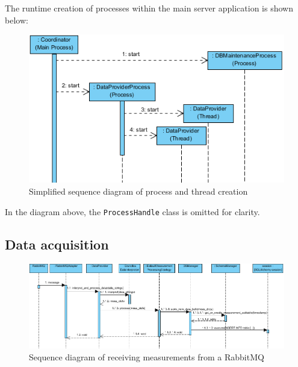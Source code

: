 The runtime creation of processes within the main server application is shown below:
\begin{figure}[H]
    \centering
    \includegraphics[width=\textwidth]{figures/seq_diagram_init}
    \caption{Simplified sequence diagram of process and thread creation}
    \label{figureSeqDiagram}
\end{figure}

In the diagram above, the \texttt{ProcessHandle} class is omitted for clarity.


\newpage
\subsection{Data acquisition}
\begin{figure}[H]
    \centering
    \includegraphics[width=0.9\textheight, angle=90]{figures/data_acq_seq_diagram}
    \caption{Sequence diagram of receiving measurements from a RabbitMQ}
    \label{figureSeqDiagram}
\end{figure}


